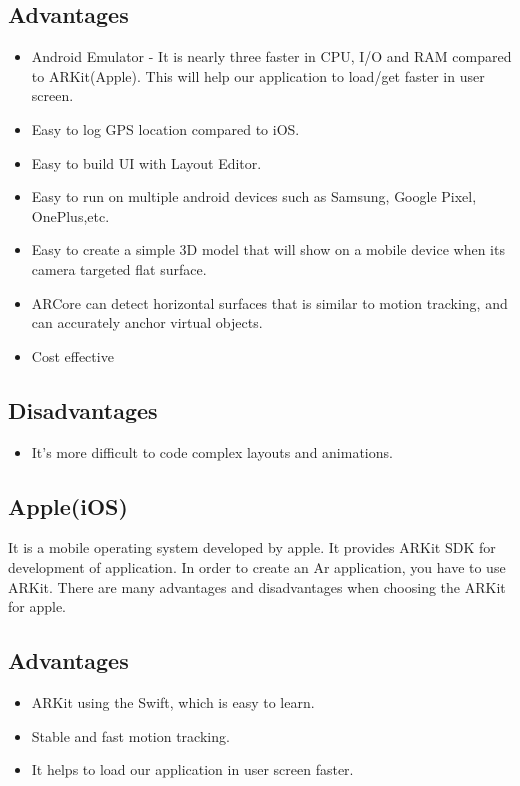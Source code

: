 \subsection{Advantages}
\begin{itemize}
  \item Android Emulator - It is nearly three faster in CPU, I/O and RAM compared to ARKit(Apple). This will help our application to load/get faster in user screen. 
  \item Easy to log GPS location compared to iOS.
  \item Easy to build UI with Layout Editor.
  \item Easy to run on multiple android devices such as Samsung, Google Pixel, OnePlus,etc.
  \item Easy to create a simple 3D model that will show on a mobile device when its camera targeted flat surface.
  \item ARCore can detect horizontal surfaces that is similar to motion tracking, and can accurately anchor virtual objects.
  \item Cost effective
\end{itemize}

\subsection{Disadvantages}
\begin{itemize}
    \item It's more difficult to code complex layouts and animations.
\end{itemize}

\subsection{Apple(iOS)}
It is a mobile operating system developed by apple. It provides ARKit SDK for development of application. In order to create an Ar application, you have to use ARKit. There are many advantages and disadvantages when choosing the ARKit for apple.

\subsection{Advantages}
\begin{itemize}
    \item ARKit using the Swift, which is easy to learn.
    \item Stable and fast motion tracking.
    \item It helps to load our application in user screen faster.
\end{itemize}

